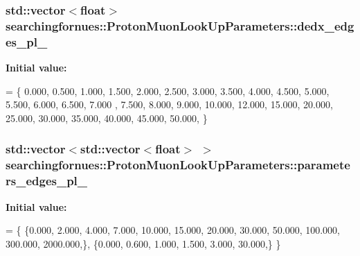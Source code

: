 \subsubsection[{\texorpdfstring{dedx\+\_\+edges\+\_\+pl\+\_\+2}{dedx_edges_pl_2}}]{\setlength{\rightskip}{0pt plus 5cm}std\+::vector$<$float$>$ searchingfornues\+::\+Proton\+Muon\+Look\+Up\+Parameters\+::dedx\+\_\+edges\+\_\+pl\+\_}\hypertarget{structsearchingfornues_1_1ProtonMuonLookUpParameters_ad227b64e46f5ddaf190356cba6c8a739}{}\label{structsearchingfornues_1_1ProtonMuonLookUpParameters_ad227b64e46f5ddaf190356cba6c8a739}
{\bfseries Initial value\+:}
\begin{DoxyCode}
= \{
    0.000, 0.500, 1.000, 1.500, 2.000, 2.500, 3.000, 3.500, 4.000, 4.500, 5.000, 5.500, 6.000, 6.500, 7.000
      , 7.500, 8.000, 9.000, 10.000, 12.000,
    15.000, 20.000, 25.000, 30.000, 35.000, 40.000, 45.000, 50.000,
    \}
\end{DoxyCode}
\subsubsection[{\texorpdfstring{parameters\+\_\+edges\+\_\+pl\+\_\+0}{parameters_edges_pl_0}}]{\setlength{\rightskip}{0pt plus 5cm}std\+::vector$<$std\+::vector$<$float$>$ $>$ searchingfornues\+::\+Proton\+Muon\+Look\+Up\+Parameters\+::parameters\+\_\+edges\+\_\+pl\+\_}\hypertarget{structsearchingfornues_1_1ProtonMuonLookUpParameters_ace4bde0821ec09a6b72c347654bf2acf}{}\label{structsearchingfornues_1_1ProtonMuonLookUpParameters_ace4bde0821ec09a6b72c347654bf2acf}
{\bfseries Initial value\+:}
\begin{DoxyCode}
= \{
    \{0.000, 2.000, 4.000, 7.000, 10.000, 15.000, 20.000, 30.000, 50.000, 100.000, 300.000, 2000.000,\},
    \{0.000, 0.600, 1.000, 1.500, 3.000, 30.000,\}
    \}
\end{DoxyCode}
